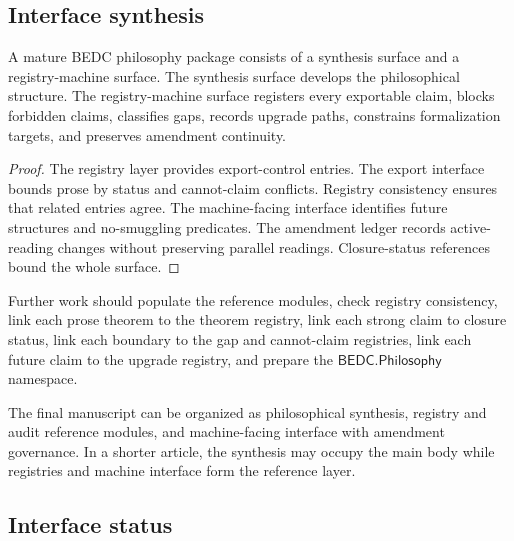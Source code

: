 \subsection{Interface synthesis}
\label{subsec:philosophy-interface-synthesis}

\begin{theorem}
\label{thm:philosophy-registry-machine-interface-synthesis}
A mature BEDC philosophy package consists of a synthesis surface and a
registry-machine surface. The synthesis surface develops the
philosophical structure. The registry-machine surface registers every
exportable claim, blocks forbidden claims, classifies gaps, records
upgrade paths, constrains formalization targets, and preserves
amendment continuity.
\end{theorem}
\begin{proof}
The registry layer provides export-control entries. The export
interface bounds prose by status and cannot-claim conflicts. Registry
consistency ensures that related entries agree. The machine-facing
interface identifies future structures and no-smuggling predicates.
The amendment ledger records active-reading changes without preserving
parallel readings. Closure-status references bound the whole surface.
\end{proof}

\begin{corollary}
\label{cor:philosophy-after-registry-layer}
Further work should populate the reference modules, check registry
consistency, link each prose theorem to the theorem registry, link each
strong claim to closure status, link each boundary to the gap and
cannot-claim registries, link each future claim to the upgrade
registry, and prepare the \(\mathsf{BEDC.Philosophy}\) namespace.
\end{corollary}

\begin{corollary}
\label{cor:philosophy-manuscript-architecture}
The final manuscript can be organized as philosophical synthesis,
registry and audit reference modules, and machine-facing interface
with amendment governance. In a shorter article, the synthesis may
occupy the main body while registries and machine interface form the
reference layer.
\end{corollary}

\subsection{Interface status}
\label{subsec:philosophy-interface-status}

